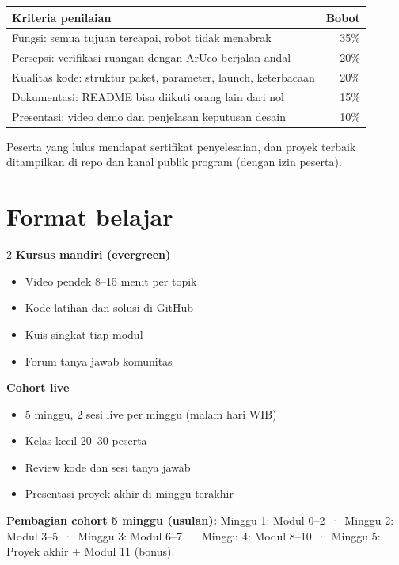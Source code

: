 \documentclass{rtl}
\begin{document}
\begin{center}
\begin{tabularx}{0.92\linewidth}{@{}X r@{}}
\toprule
\textbf{Kriteria penilaian} & \textbf{Bobot} \\
\midrule
Fungsi: semua tujuan tercapai, robot tidak menabrak & 35\% \\
Persepsi: verifikasi ruangan dengan ArUco berjalan andal & 20\% \\
Kualitas kode: struktur paket, parameter, launch, keterbacaan & 20\% \\
Dokumentasi: README bisa diikuti orang lain dari nol & 15\% \\
Presentasi: video demo dan penjelasan keputusan desain & 10\% \\
\bottomrule
\end{tabularx}
\end{center}

Peserta yang lulus mendapat sertifikat penyelesaian, dan proyek terbaik ditampilkan
di repo dan kanal publik program (dengan izin peserta).

\section*{Format belajar}
\begin{multicols}{2}
\textbf{Kursus mandiri (evergreen)}
\begin{itemize}
  \item Video pendek 8--15 menit per topik
  \item Kode latihan dan solusi di GitHub
  \item Kuis singkat tiap modul
  \item Forum tanya jawab komunitas
\end{itemize}
\columnbreak
\textbf{Cohort live}
\begin{itemize}
  \item 5 minggu, 2 sesi live per minggu (malam hari WIB)
  \item Kelas kecil 20--30 peserta
  \item Review kode dan sesi tanya jawab
  \item Presentasi proyek akhir di minggu terakhir
\end{itemize}
\end{multicols}

\textbf{Pembagian cohort 5 minggu (usulan):}
Minggu 1: Modul 0--2 \,·\,
Minggu 2: Modul 3--5 \,·\,
Minggu 3: Modul 6--7 \,·\,
Minggu 4: Modul 8--10 \,·\,
Minggu 5: Proyek akhir + Modul 11 (bonus).
\end{document}
